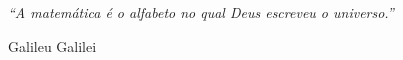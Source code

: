 \begin{center}
\vspace*{\fill}
\hspace{.45\textwidth} %
    \begin{minipage}{.5\textwidth}
    \flushright
    \noindent \textit{``A matemática é o alfabeto no qual Deus escreveu o universo.''}
    
    Galileu Galilei
    \end{minipage}
\end{center}